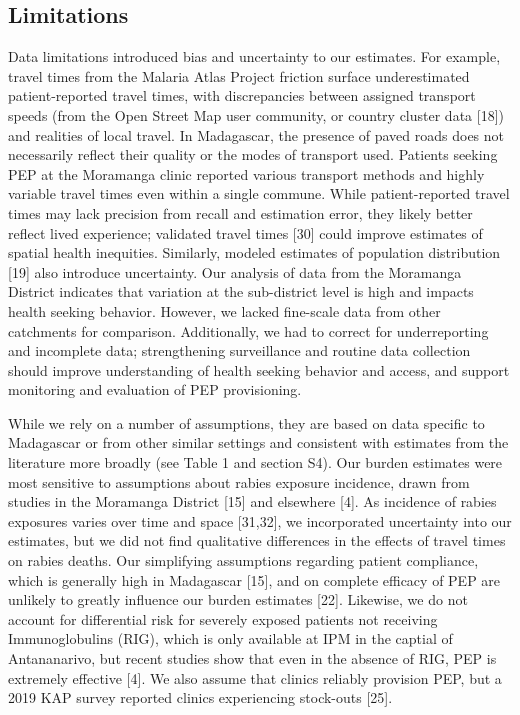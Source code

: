 \documentclass[
]{book}
\begin{document}
\hypertarget{limitations}{%
\subsection{Limitations}\label{limitations}}

Data limitations introduced bias and uncertainty to our estimates. For
example, travel times from the Malaria Atlas Project friction surface
underestimated patient-reported travel times, with discrepancies between
assigned transport speeds (from the Open Street Map user community, or
country cluster data {[}18{]}) and realities of local travel. In
Madagascar, the presence of paved roads does not necessarily reflect
their quality or the modes of transport used. Patients seeking PEP at
the Moramanga clinic reported various transport methods and highly
variable travel times even within a single commune. While
patient-reported travel times may lack precision from recall and
estimation error, they likely better reflect lived experience; validated
travel times {[}30{]} could improve estimates of spatial health
inequities. Similarly, modeled estimates of population distribution
{[}19{]} also introduce uncertainty. Our analysis of data from the
Moramanga District indicates that variation at the sub-district level is
high and impacts health seeking behavior. However, we lacked fine-scale
data from other catchments for comparison. Additionally, we had to
correct for underreporting and incomplete data; strengthening
surveillance and routine data collection should improve understanding of
health seeking behavior and access, and support monitoring and
evaluation of PEP provisioning.

While we rely on a number of assumptions, they are based on data
specific to Madagascar or from other similar settings and consistent
with estimates from the literature more broadly (see Table 1 and section
S4). Our burden estimates were most sensitive to assumptions about
rabies exposure incidence, drawn from studies in the Moramanga District
{[}15{]} and elsewhere {[}4{]}. As incidence of rabies exposures varies over
time and space {[}31,32{]}, we incorporated uncertainty into our
estimates, but we did not find qualitative differences in the effects of
travel times on rabies deaths. Our simplifying assumptions regarding
patient compliance, which is generally high in Madagascar {[}15{]}, and on
complete efficacy of PEP are unlikely to greatly influence our burden
estimates {[}22{]}. Likewise, we do not account for differential risk for
severely exposed patients not receiving Immunoglobulins (RIG), which is
only available at IPM in the captial of Antananarivo, but recent studies
show that even in the absence of RIG, PEP is extremely effective {[}4{]}.
We also assume that clinics reliably provision PEP, but a 2019 KAP
survey reported clinics experiencing stock-outs {[}25{]}.
\end{document}
